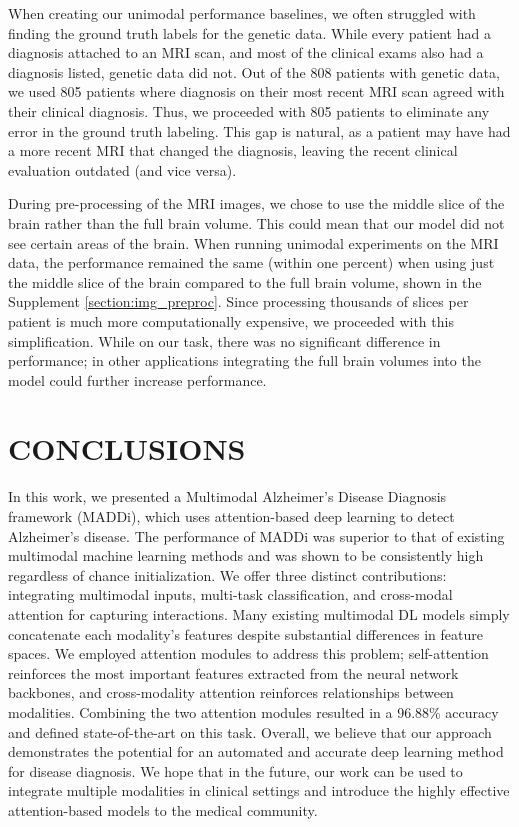 \documentclass[11pt]{article}
\begin{document}
When creating our unimodal performance baselines, we often struggled with finding the ground truth labels for the genetic data. While every patient had a diagnosis attached to an MRI scan, and most of the clinical exams also had a diagnosis listed, genetic data did not. Out of the 808 patients with genetic data, we used 805 patients where diagnosis on their most recent MRI scan agreed with their clinical diagnosis. Thus, we proceeded with 805 patients to eliminate any error in the ground truth labeling. This gap is natural, as a patient may have had a more recent MRI that changed the diagnosis, leaving the recent clinical evaluation outdated (and vice versa).

During pre-processing of the MRI images, we chose to use the middle slice of the brain rather than the full brain volume. This could mean that our model did not see certain areas of the brain. When running unimodal experiments on the MRI data, the performance remained the same (within one percent) when using just the middle slice of the brain compared to the full brain volume, shown in the Supplement \ref{section:img_preproc}. Since processing thousands of slices per patient is much more computationally expensive, we proceeded with this simplification. While on our task, there was no significant difference in performance; in other applications integrating the full brain volumes into the model could further increase performance. 


\section*{CONCLUSIONS}

In this work, we presented a Multimodal Alzheimer's Disease Diagnosis framework (MADDi), which uses attention-based deep learning to detect Alzheimer's disease. The performance of MADDi was superior to that of existing multimodal machine learning methods and was shown to be consistently high regardless of chance initialization. We offer three distinct contributions: integrating multimodal inputs, multi-task classification, and cross-modal attention for capturing interactions. Many existing multimodal DL models simply concatenate each modality's features despite substantial differences in feature spaces. We employed attention modules to address this problem; self-attention reinforces the most important features extracted from the neural network backbones, and cross-modality attention \cite{Tan2019LXMERTLC} reinforces relationships between modalities. Combining the two attention modules resulted in a 96.88\% accuracy and defined state-of-the-art on this task. Overall, we believe that our approach demonstrates the potential for an automated and accurate deep learning method for disease diagnosis. We hope that in the future, our work can be used to integrate multiple modalities in clinical settings and introduce the highly effective attention-based models to the medical community. 
\end{document}
